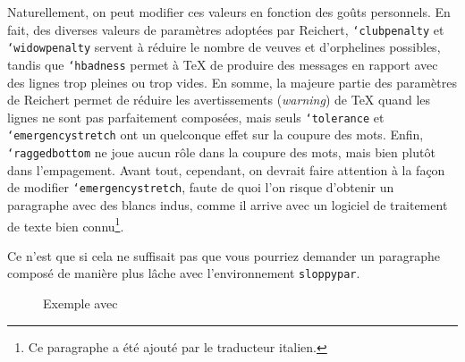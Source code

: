 \documentclass[fontsize=11pt, paper=a4, pagesize, captions=tableheading, numbers=enddot, toc=graduated, footnotes=multiple]{scrartcl}%
\DeclareRobustCommand*{\Macro}[1]{\mbox{\texttt{\char`\\#1}}}
\begin{document}
Naturellement, on peut modifier ces valeurs en fonction des goûts personnels. En fait, des diverses valeurs de paramètres adoptées par Reichert, \Macro{clubpenalty} et \Macro{widowpenalty} servent à réduire le nombre de veuves et d’orphelines possibles, tandis que \Macro{hbadness} permet à \TeX{} de produire des messages en rapport avec des lignes trop pleines ou trop vides. En somme, la majeure partie des paramètres de Reichert permet de réduire les avertissements (\emph{warning}) de \TeX{} quand les lignes ne sont pas parfaitement composées, mais seuls \Macro{tolerance} et \Macro{emergencystretch} ont un quelconque effet sur la coupure des mots. Enfin, \Macro{raggedbottom} ne joue aucun rôle dans la coupure des mots, mais bien plutôt dans l’empagement. Avant tout, cependant, on devrait faire attention à la façon de modifier \Macro{emergencystretch}, faute de quoi l’on risque d’obtenir un paragraphe avec des blancs indus, comme il arrive avec un logiciel de traitement de texte bien connu\footnote{Ce paragraphe a été ajouté par le traducteur italien.}.

Ce n'est que si cela ne suffisait pas que vous pourriez demander un paragraphe composé de manière plus lâche avec l'environnement \texttt{sloppypar}.

\begin{figure}[htp]
  \begin{minipage}[t]{.48\textwidth}
    \centering
    \linespread{1.0}
    {\fontsize{10pt}{12pt}\selectfont
      }%
    \caption{Exemple avec les valeurs standard de \LaTeX}%
    \label{fig:beispiel-mit-latex}%
  \end{minipage}%
  \hfill%
  \begin{minipage}[t]{.48\textwidth}
    \centering
    \linespread{1.0}
    {\fontsize{10pt}{12pt}\selectfont
      }%
    \caption{Exemple avec \texttt{\string\sloppy}}%
    \label{fig:beisp-mit-textttstr}
  \end{minipage}
\end{figure}
\end{document}
